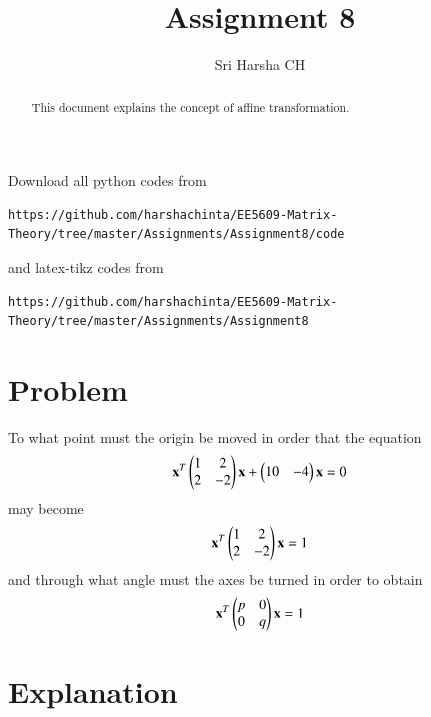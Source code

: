 \documentclass[journal,12pt,twocolumn]{IEEEtran}
\begin{document}
\renewcommand{\thefigure}{\theproblem}

\def\putbox#1#2#3{\makebox[0in][l]{\makebox[#1][l]{}\raisebox{\baselineskip}[0in][0in]{\raisebox{#2}[0in][0in]{#3}}}}
     \def\rightbox#1{\makebox[0in][r]{#1}}
     \def\centbox#1{\makebox[0in]{#1}}
     \def\topbox#1{\raisebox{-\baselineskip}[0in][0in]{#1}}
     \def\midbox#1{\raisebox{-0.5\baselineskip}[0in][0in]{#1}}
\vspace{3cm}
\title{Assignment 8}
\author{Sri Harsha CH}

\maketitle
\newpage

\bigskip
\renewcommand{\thefigure}{\theenumi}
\renewcommand{\thetable}{\theenumi}

\begin{abstract}
This document explains the concept of affine transformation.
\end{abstract}

Download all python codes from 
\begin{lstlisting}
https://github.com/harshachinta/EE5609-Matrix-Theory/tree/master/Assignments/Assignment8/code
\end{lstlisting}
%
and latex-tikz codes from 
%
\begin{lstlisting}
https://github.com/harshachinta/EE5609-Matrix-Theory/tree/master/Assignments/Assignment8
\end{lstlisting}
%
\section{Problem}
To what point must the origin be moved in order that the equation
\begin{align}
    \mathbf{x}^T\begin{pmatrix}1 & 2\\2 & -2\end{pmatrix}\mathbf{x}+\begin{pmatrix}10 & -4\end{pmatrix}\mathbf{x}=0 \label{eq:q1}
\end{align}
may become
\begin{align}
    \mathbf{x}^T\begin{pmatrix}1 & 2\\2 & -2\end{pmatrix}\mathbf{x}=1\label{eq:q2}
\end{align}
and through what angle must the axes be turned in order to obtain
\begin{align}
    \mathbf{x}^T\begin{pmatrix}p & 0\\0 & q\end{pmatrix}\mathbf{x}=1\label{eq:q3}
\end{align}
\section{Explanation}
\end{document}
